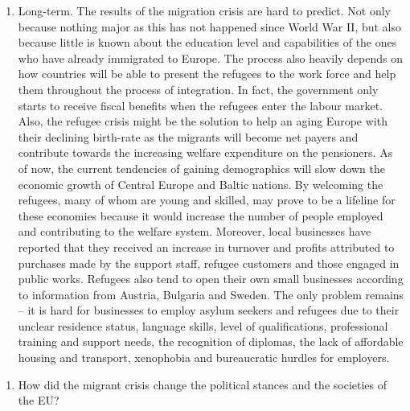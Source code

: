 \documentclass[]{article}
\providecommand{\tightlist}{%
  \setlength{\itemsep}{0pt}\setlength{\parskip}{0pt}}
\begin{document}
\begin{enumerate}
\def\labelenumi{\arabic{enumi})}
\setcounter{enumi}{1}
\tightlist
\item
  Long-term. The results of the migration crisis are hard to predict.
  Not only because nothing major as this has not happened since World
  War II, but also because little is known about the education level and
  capabilities of the ones who have already immigrated to Europe. The
  process also heavily depends on how countries will be able to present
  the refugees to the work force and help them throughout the process of
  integration. In fact, the government only starts to receive fiscal
  benefits when the refugees enter the labour market. Also, the refugee
  crisis might be the solution to help an aging Europe with their
  declining birth-rate as the migrants will become net payers and
  contribute towards the increasing welfare expenditure on the
  pensioners. As of now, the current tendencies of gaining demographics
  will slow down the economic growth of Central Europe and Baltic
  nations. By welcoming the refugees, many of whom are young and
  skilled, may prove to be a lifeline for these economies because it
  would increase the number of people employed and contributing to the
  welfare system. Moreover, local businesses have reported that they
  received an increase in turnover and profits attributed to purchases
  made by the support staff, refugee customers and those engaged in
  public works. Refugees also tend to open their own small businesses
  according to information from Austria, Bulgaria and Sweden. The only
  problem remains -- it is hard for businesses to employ asylum seekers
  and refugees due to their unclear residence status, language skills,
  level of qualifications, professional training and support needs, the
  recognition of diplomas, the lack of affordable housing and transport,
  xenophobia and bureaucratic hurdles for employers.
\end{enumerate}

\begin{enumerate}
\def\labelenumi{\Roman{enumi}.}
\setcounter{enumi}{2}
\tightlist
\item
  How did the migrant crisis change the political stances and the
  societies of the EU?
\end{enumerate}
\end{document}
